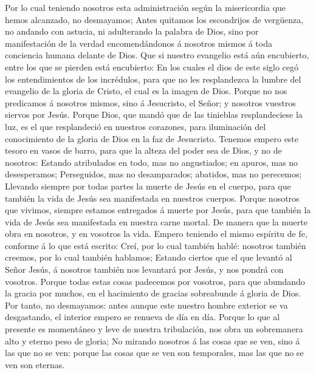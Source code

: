  Por lo cual teniendo nosotros esta administración según la
misericordia que hemos alcanzado, no desmayamos;  Antes
quitamos los escondrijos de vergüenza, no andando con astucia, ni
adulterando la palabra de Dios, sino por manifestación de la verdad
encomendándonos á nosotros mismos á toda conciencia humana delante de
Dios.  Que si nuestro evangelio está aún encubierto, entre
los que se pierden está encubierto:  En los cuales el dios
de este siglo cegó los entendimientos de los incrédulos, para que no les
resplandezca la lumbre del evangelio de la gloria de Cristo, el cual es
la imagen de Dios.  Porque no nos predicamos á nosotros
mismos, sino á Jesucristo, el Señor; y nosotros vuestros siervos por
Jesús.  Porque Dios, que mandó que de las tinieblas
resplandeciese la luz, es el que resplandeció en nuestros corazones,
para iluminación del conocimiento de la gloria de Dios en la faz de
Jesucristo.  Tenemos empero este tesoro en vasos de barro,
para que la alteza del poder sea de Dios, y no de nosotros: 
Estando atribulados en todo, mas no angustiados; en apuros, mas no
desesperamos;  Perseguidos, mas no desamparados; abatidos,
mas no perecemos;  Llevando siempre por todas partes la
muerte de Jesús en el cuerpo, para que también la vida de Jesús sea
manifestada en nuestros cuerpos.  Porque nosotros que
vivimos, siempre estamos entregados á muerte por Jesús, para que también
la vida de Jesús sea manifestada en nuestra carne mortal. 
De manera que la muerte obra en nosotros, y en vosotros la vida.
 Empero teniendo el mismo espíritu de fe, conforme á lo que
está escrito: Creí, por lo cual también hablé: nosotros también creemos,
por lo cual también hablamos;  Estando ciertos que el que
levantó al Señor Jesús, á nosotros también nos levantará por Jesús, y
nos pondrá con vosotros.  Porque todas estas cosas
padecemos por vosotros, para que abundando la gracia por muchos, en el
hacimiento de gracias sobreabunde á gloria de Dios.  Por
tanto, no desmayamos: antes aunque este nuestro hombre exterior se va
desgastando, el interior empero se renueva de día en día. 
Porque lo que al presente es momentáneo y leve de nuestra tribulación,
nos obra un sobremanera alto y eterno peso de gloria;  No
mirando nosotros á las cosas que se ven, sino á las que no se ven:
porque las cosas que se ven son temporales, mas las que no se ven son
eternas.


